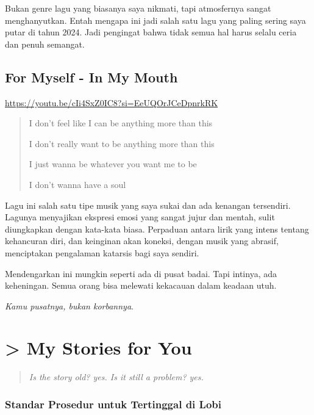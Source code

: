\documentclass[
  letterpaper,
  DIV=11,
  numbers=noendperiod]{scrreprt}
\begin{document}
Bukan genre lagu yang biasanya saya nikmati, tapi atmosfernya sangat
menghanyutkan. Entah mengapa ini jadi salah satu lagu yang paling sering
saya putar di tahun 2024. Jadi pengingat bahwa tidak semua hal harus
selalu ceria dan penuh semangat.

\section{For Myself - In My Mouth}\label{for-myself---in-my-mouth}

\url{https://youtu.be/cIi4SxZ0IC8?si=EeUQOrJCeDpnrkRK}

\begin{quote}
I don't feel like I can be anything more than this

I don't really want to be anything more than this

I just wanna be whatever you want me to be

I don't wanna have a soul
\end{quote}

Lagu ini salah satu tipe musik yang saya sukai dan ada kenangan
tersendiri. Lagunya menyajikan ekspresi emosi yang sangat jujur dan
mentah, sulit diungkapkan dengan kata-kata biasa. Perpaduan antara lirik
yang intens tentang kehancuran diri, dan keinginan akan koneksi, dengan
musik yang abrasif, menciptakan pengalaman katarsis bagi saya sendiri.

Mendengarkan ini mungkin seperti ada di pusat badai. Tapi intinya, ada
keheningan. Semua orang bisa melewati kekacauan dalam keadaan utuh.

\emph{Kamu pusatnya, bukan korbannya}.


\chapter{\textgreater{} My Stories for You}\label{my-stories-for-you}

\begin{quote}
\emph{Is the story old? yes. Is it still a problem? yes.}
\end{quote}

\subsection{\texorpdfstring{\textbf{Standar Prosedur untuk Tertinggal di
Lobi}\\
}{Standar Prosedur untuk Tertinggal di Lobi }}\label{standar-prosedur-untuk-tertinggal-di-lobi}
\end{document}
